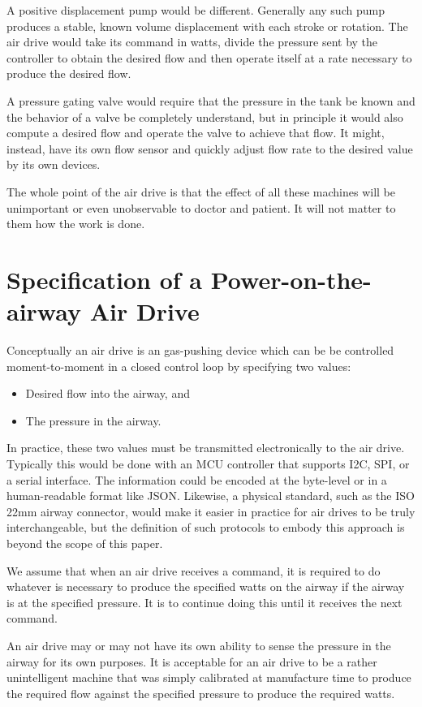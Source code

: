 \documentclass[conference]{article}
\begin{document}
A positive displacement pump would be different. Generally any such pump produces a stable, known volume displacement with each
stroke or rotation. The air drive would take its command in watts, divide the pressure sent by the controller to obtain
the desired flow and then operate itself at a rate necessary to produce the desired flow.

A pressure gating valve would require that the pressure in the tank be known and the behavior of a valve
be completely understand, but in principle it would also compute a desired flow and operate the valve to achieve that
flow. It might, instead, have its own flow sensor and quickly adjust flow rate to the desired value by its own devices.

The whole point of the air drive is that the effect of all these machines will be unimportant or even unobservable
to doctor and patient. It will not matter to them how the work is done.

\section{Specification of a Power-on-the-airway Air Drive}

Conceptually an air drive is an gas-pushing device which can be be controlled moment-to-moment in a closed control loop
by specifying two values:
\begin{itemize}
 \item Desired flow into the airway, and
 \item The pressure in the airway.
\end{itemize}

In practice, these two values must be transmitted electronically to the air drive.
Typically this would be done with an MCU controller that supports I2C, SPI,
or a serial interface.
The information could be encoded at the byte-level or
in a human-readable format like JSON.
Likewise, a physical standard, such as the ISO 22mm airway connector,
would make it easier
in practice for air drives to be truly interchangeable, but
the definition of such protocols to embody this approach
is beyond the scope of this paper.

We assume that when an air drive receives a command, it is required to
do whatever is necessary to produce the specified
watts on the airway if the airway is at the specified pressure.
It is to continue doing this until it receives the next command.

An air drive may or may not have its own ability to sense the pressure in the airway
for its own purposes. It is acceptable for an air drive to be a rather unintelligent
machine that was simply calibrated at manufacture time to produce the required
flow against the specified pressure to produce the required watts.
\end{document}
